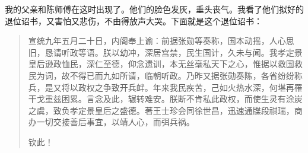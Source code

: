 我的父亲和陈师傅在这时出现了。他们的脸色发灰，垂头丧气。我看了他们拟好的退位诏书，又害怕又悲伤，不由得放声大哭。下面就是这个退位诏书：\\

\begin{quote}
	宣统九年五月二十日，内阁奉上谕：前据张勋等奏称，国本动摇，人心思旧，恳请听政等语。朕以幼冲，深居宫禁，民生国计，久未与闻。我孝定景皇后逊政恤民，深仁至德，仰念遗训，本无丝毫私天下之心，惟据以救国救民为词，故不得已而九如所请，临朝听政。乃昨又据张勋奏陈，各省纷纷称兵，是又将以政权之争致开兵衅。年来我民疾苦，己如火热水深，何堪再罹干戈重兹困累。言念及此，辗转难安。朕断不肯私此政权，而使生灵有涂炭之虞，致负孝定景皇后之盛德。著王士珍会同徐世昌，迅速通牒段祺瑞，商办一切交接善后事宜，以靖人心，而弭兵祸。\\

\begin{flushright}
	钦此！
\end{flushright}

\end{quote}
